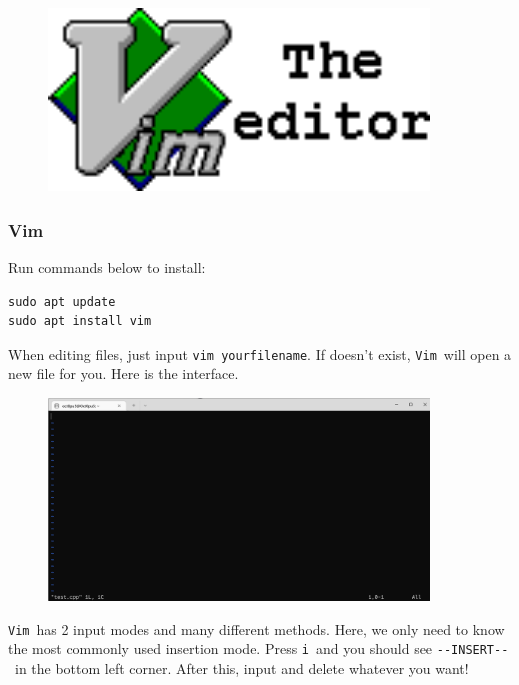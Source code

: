 \documentclass[12pt]{ctexart}
\begin{document}
\begin{figure}[H]
    \centering
    \includegraphics[width=0.9\textwidth,keepaspectratio]{assets/Linux/1.3 How to edit files on Linux/1.png}
\end{figure}

\subsubsection{\textbf{Vim}}

Run commands below to install:

\begin{adjustwidth}{2em}{0pt}
\begin{verbatim}
sudo apt update
sudo apt install vim
\end{verbatim}
\end{adjustwidth}

When editing files, just input \texttt{vim\ yourfilename}. If
doesn't exist, \texttt{Vim}\ will open a new file for
you. Here is the interface.

\begin{figure}[H]
    \centering
    \includegraphics[width=0.9\textwidth,keepaspectratio]{assets/Linux/1.3 How to edit files on Linux/2.png}
\end{figure}

\texttt{Vim}\ has 2 input modes and many different methods. Here, we only
need to know the most commonly used insertion mode. Press \texttt{i}\ and
you should see \texttt{-\/-INSERT-\/-}\ in the bottom left corner. After
this, input and delete whatever you want!
\end{document}

